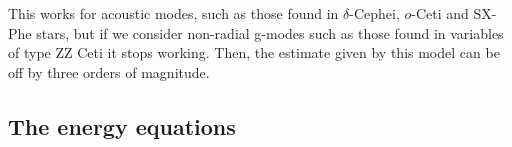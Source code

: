 \documentclass[main.tex]{subfiles}
\begin{document}
This works for acoustic modes, such as those found in \(\delta \)-Cephei, \(o\)-Ceti and SX-Phe stars, but if we consider non-radial g-modes such as those found in variables of type ZZ Ceti it stops working. Then, the estimate given by this model can be off by three orders of magnitude. 

\subsection{The energy equations}
\end{document}
